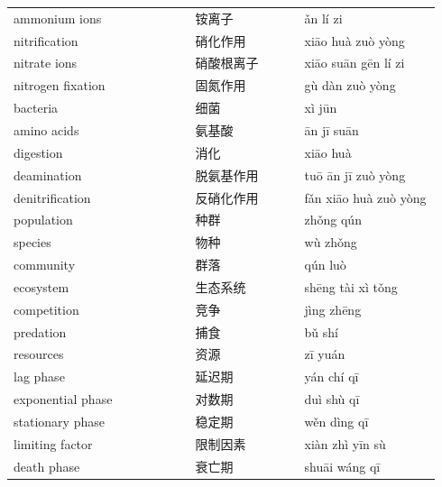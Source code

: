 \documentclass[11pt]{article}
\begin{document}
\begin{longtable}{@{}p{0.40\linewidth}p{0.24\linewidth}p{0.30\linewidth}@{}}
ammonium ions & 铵离子 & ǎn lí zi \\
nitrification & 硝化作用 & xiāo huà zuò yòng \\
nitrate ions & 硝酸根离子 & xiāo suān gēn lí zi \\
nitrogen fixation & 固氮作用 & gù dàn zuò yòng \\
bacteria & 细菌 & xì jūn \\
amino acids & 氨基酸 & ān jī suān \\
digestion & 消化 & xiāo huà \\
deamination & 脱氨基作用 & tuō ān jī zuò yòng \\
denitrification & 反硝化作用 & fǎn xiāo huà zuò yòng \\
population & 种群 & zhǒng qún \\
species & 物种 & wù zhǒng \\
community & 群落 & qún luò \\
ecosystem & 生态系统 & shēng tài xì tǒng \\
competition & 竞争 & jìng zhēng \\
predation & 捕食 & bǔ shí \\
resources & 资源 & zī yuán \\
lag phase & 延迟期 & yán chí qī \\
exponential phase & 对数期 & duì shù qī \\
stationary phase & 稳定期 & wěn dìng qī \\
limiting factor & 限制因素 & xiàn zhì yīn sù \\
death phase & 衰亡期 & shuāi wáng qī \\
\end{longtable}
\end{document}
